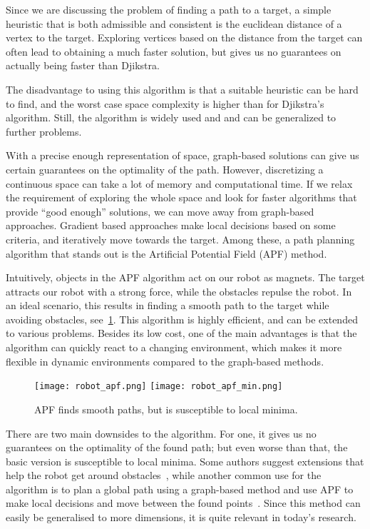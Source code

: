Since we are discussing the problem of finding a path to a target, a simple heuristic that is both admissible and consistent is the euclidean distance of a vertex to the target. Exploring vertices based on the distance from the target can often lead to obtaining a much faster solution, but gives us no guarantees on actually being faster than Djikstra.

The disadvantage to using this algorithm is that a suitable heuristic can be hard to find, and the worst case space complexity is higher than for Djikstra's algorithm. Still, the algorithm is widely used and and can be generalized to further problems.

With a precise enough representation of space, graph-based solutions can give us certain guarantees on the optimality of the path. However, discretizing a continuous space can take a lot of memory and computational time.
If we relax the requirement of exploring the whole space and look for faster algorithms that provide \enquote{good enough} solutions, we can move away from graph-based approaches. Gradient based approaches make local decisions based on some criteria, and iteratively move towards the target. Among these, a path planning algorithm that stands out is the Artificial Potential Field (APF) method.


Intuitively, objects in the APF algorithm act on our robot as magnets. The target attracts our robot with a strong force, while the obstacles repulse the robot. In an ideal scenario, this results in finding a smooth path to the target while avoiding obstacles, see~\ref{fig:apf}. This algorithm is highly efficient, and can be extended to various problems. Besides its low cost, one of the main advantages is that the algorithm can quickly react to a changing environment, which makes it more flexible in dynamic environments compared to the graph-based methods.

\begin{figure}[ht]
  \centering
  \begin{minipage}{0.8\textwidth}
    \texttt{[image: robot\_apf.png]}
    \texttt{[image: robot\_apf\_min.png]}
  \end{minipage}
  \caption{APF finds smooth paths, but is susceptible to local minima.}\label{fig:apf}
\end{figure}

There are two main downsides to the algorithm. For one, it gives us no guarantees on the optimality of the found path; but even worse than that, the basic version is susceptible to local minima. Some authors suggest extensions that help the robot get around obstacles~\cite{apf, apf2}, while another common use for the algorithm is to plan a global path using a graph-based method and use APF to make local decisions and move between the found points~\cite{hybrid}. Since this method can easily be generalised to more dimensions, it is quite relevant in today's research.


